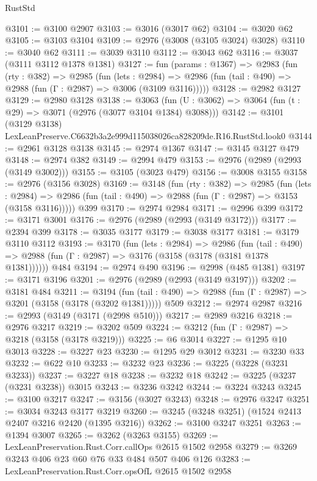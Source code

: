 \begin{lexlean}{RustStd}
\begin{coremodule}
@3101 := @3100 @2907
@3103 := @3016 (@3017 @62)
@3104 := @3020 @62
@3105 := @3103 @3104
@3109 := @2976 (@3008 (@3105 @3024) @3028)
@3110 := @3040 @62
@3111 := @3039 @3110
@3112 := @3043 @62
@3116 := @3037 (@3111 @3112 @1378 @1381)
@3127 := fun (params : @1367) =>
  @2983
    (fun (rty : @382) =>
    @2985
      (fun (lets : @2984) =>
      @2986 (fun (tail : @490) => @2988 (fun (Γ : @2987) => @3006 (@3109 @3116)))))
@3128 := @2982 @3127
@3129 := @2980 @3128
@3138 := @3063 (fun (U : @3062) => @3064 (fun (t : @29) => @3071 (@2976 (@3077 @3104 @1384) @3088)))
@3142 := @3101 (@3129 @3138) LexLeanPreserve.C6632b3a2e999d115038026ca828209de.R16.RustStd.look0
@3144 := @2961 @3128 @3138
@3145 := @2974 @1367
@3147 := @3145 @3127 @479
@3148 := @2974 @382
@3149 := @2994 @479
@3153 := @2976 (@2989 (@2993 (@3149 @3002)))
@3155 := @3105 (@3023 @479)
@3156 := @3008 @3155
@3158 := @2976 (@3156 @3028)
@3169 := @3148
    (fun (rty : @382) =>
    @2985
      (fun (lets : @2984) =>
      @2986 (fun (tail : @490) => @2988 (fun (Γ : @2987) => @3153 (@3158 @3116)))))
    @399
@3170 := @2974 @2984
@3171 := @2996 @399
@3172 := @3171 @3001
@3176 := @2976 (@2989 (@2993 (@3149 @3172)))
@3177 := @2394 @399
@3178 := @3035 @3177
@3179 := @3038 @3177
@3181 := @3179 @3110 @3112
@3193 := @3170
    (fun (lets : @2984) =>
    @2986
      (fun (tail : @490) => @2988 (fun (Γ : @2987) => @3176 (@3158 (@3178 (@3181 @1378 @1381))))))
    @484
@3194 := @2974 @490
@3196 := @2998 (@485 @1381)
@3197 := @3171 @3196
@3201 := @2976 (@2989 (@2993 (@3149 @3197)))
@3202 := @3181 @484
@3211 := @3194
    (fun (tail : @490) => @2988 (fun (Γ : @2987) => @3201 (@3158 (@3178 (@3202 @1381)))))
    @509
@3212 := @2974 @2987
@3216 := @2993 (@3149 (@3171 (@2998 @510)))
@3217 := @2989 @3216
@3218 := @2976 @3217
@3219 := @3202 @509
@3224 := @3212 (fun (Γ : @2987) => @3218 (@3158 (@3178 @3219)))
@3225 := @6 @3014
@3227 := @1295 @10 @3013
@3228 := @3227 @23
@3230 := @1295 @29 @3012
@3231 := @3230 @33
@3232 := @622 @10
@3233 := @3232 @23
@3236 := @3225 (@3228 (@3231 @3233))
@3237 := @3227 @18
@3238 := @3232 @18
@3242 := @3225 (@3237 (@3231 @3238)) @3015
@3243 := @3236 @3242
@3244 := @3224 @3243
@3245 := @3100 @3217
@3247 := @3156 (@3027 @3243)
@3248 := @2976 @3247
@3251 := @3034 @3243 @3177 @3219
@3260 := @3245 (@3248 @3251) (@1524 @2413 @2407 @3216 @2420 (@1395 @3216))
@3262 := @3100 @3247 @3251
@3263 := @1394 @3007
@3265 := @3262 (@3263 @3155)
@3269 := LexLeanPreservation.Rust.Corr.callOps @2615 @1502 @2958
@3279 := @3269 @3243 @406 @23 @60 @76 @33 @484 @507 @406 @126
@3283 := LexLeanPreservation.Rust.Corr.opsOfL @2615 @1502 @2958

\end{coremodule}
\end{lexlean}
